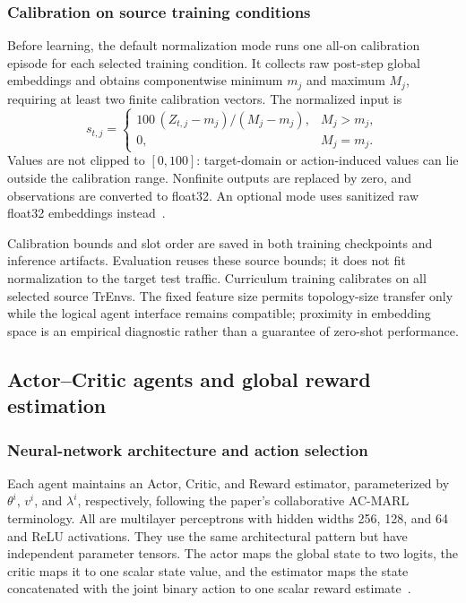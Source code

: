 \documentclass[11pt,a4paper]{article}
\newcommand{\code}[1]{\texttt{\detokenize{#1}}}
\begin{document}
\subsubsection{Calibration on source training conditions}

Before learning, the default \code{source} normalization mode runs one all-on
calibration episode for each selected training condition. It collects raw
post-step global embeddings and obtains componentwise minimum $m_j$ and
maximum $M_j$, requiring at least two finite calibration vectors. The normalized
input is
\begin{equation}
 s_{t,j}=\begin{cases}
 100\,(Z_{t,j}-m_j)/(M_j-m_j), & M_j>m_j,\\
 0, & M_j=m_j.
 \end{cases}
 \label{eq:normalization}
\end{equation}
Values are not clipped to $[0,100]$: target-domain or action-induced values can
lie outside the calibration range. Nonfinite outputs are replaced by zero,
and observations are converted to float32. An optional \code{identity} mode
uses sanitized raw float32 embeddings instead~\cite{code-embedding}.

Calibration bounds and slot order are saved in both training checkpoints and
inference artifacts. Evaluation reuses these source bounds; it does not fit
normalization to the target test traffic. Curriculum training calibrates on
all selected source TrEnvs. The fixed feature size permits topology-size
transfer only while the logical agent interface remains compatible; proximity
in embedding space is an empirical diagnostic rather than a guarantee of
zero-shot performance.

\subsection{Actor--Critic agents and global reward estimation}
\label{sec:learning}

\subsubsection{Neural-network architecture and action selection}

Each agent maintains an Actor, Critic, and Reward estimator, parameterized by
$\theta^i$, $v^i$, and $\lambda^i$, respectively, following the paper's
collaborative AC-MARL terminology. All are multilayer perceptrons with hidden
widths 256, 128, and 64 and ReLU activations. They use the same architectural
pattern but have independent parameter tensors. The actor maps the global state
to two logits, the critic maps it to one scalar state value, and the estimator
maps the state concatenated with the joint binary action to one scalar reward
estimate~\cite{code-learning}.
\end{document}
